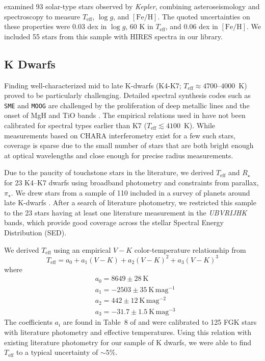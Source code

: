 \documentclass[preprint2]{aastex6}
\newcommand{\Kepler}{\textit{Kepler}\xspace}
\newcommand{\Rstar}{\ensuremath{R_{\star}}\xspace}
\newcommand{\fe}{\ensuremath{\mathrm{[Fe/H]}}\xspace}
\newcommand{\teff}{\ensuremath{T_{\mathrm{eff}}}\xspace}
\newcommand{\logg}{\ensuremath{\log g}\xspace}
\newcommand{\plx}{\ensuremath{\pi_\star}\xspace}
\newcommand{\kdwarfnum}{23\xspace}
\newcommand{\brunttnum}{55\xspace}
\begin{document}
\cite{Bruntt12} examined 93 solar-type stars observed by \Kepler, combining asteroseismology and spectroscopy to measure \teff, \logg, and \fe. The quoted uncertainties on these properties were 0.03 dex in \logg, 60 K in \teff, and 0.06 dex in \fe. We included \brunttnum stars from this sample with HIRES spectra in our library.


\subsection{K Dwarfs}
\label{ssec:kdwarfs}
Finding well-characterized mid to late K-dwarfs (K4-K7; $\teff \approx 4700$--$4000$~K) proved to be particularly challenging. Detailed spectral synthesis codes such as {\tt SME} and {\tt MOOG} are challenged by the proliferation of deep metallic lines and the onset of MgH and TiO bands \citep{Gray09}. The empirical relations used in \cite{Mann15} have not been calibrated for spectral types earlier than K7 ($\teff\lesssim4100$~K). While measurements based on CHARA interferometry exist for a few such stars, coverage is sparse due to the small number of stars that are both bright enough at optical wavelengths and close enough for precise radius measurements.

Due to the paucity of touchstone stars in the literature, we derived \teff and \Rstar for \kdwarfnum K4--K7 dwarfs using broadband photometry and constraints from parallax, \plx. We drew stars from a sample of 110 included in a survey of planets around late K-dwarfs \citep{Gaidos13}. After a search of literature photometry, we restricted this sample to the \kdwarfnum stars having at least one literature measurement in the {\em UBVRIJHK} bands, which provide good coverage across the stellar Spectral Energy Distribution (SED).

We derived \teff using an empirical $V-K$ color-temperature relationship from \cite{Boyajian13}
\[
\label{eq:colortemp}
\teff = a_0 + a_1 (V - K) + a_2 (V - K)^2 + a_3 (V - K)^3
\]
where
\begin{align*}
&a_0 = 8649 \pm 28~\mathrm{K}\\
&a_1 = -2503 \pm 35~\mathrm{K}\, \mathrm{mag}^{-1}\\
&a_2 = 442 \pm 12~\mathrm{K}\, \mathrm{mag}^{-2}\\
&a_3 = -31.7 \pm 1.5~\mathrm{K}\, \mathrm{mag}^{-3}
\end{align*}
The coefficients $a_i$ are found in Table~8 of \cite{Boyajian13} and were calibrated to 125 FGK stars with literature photometry and effective temperatures. Using this relation with existing literature photometry for our sample of K dwarfs, we were able to find \teff to a typical uncertainty of $\sim 5\%$.
\end{document}
